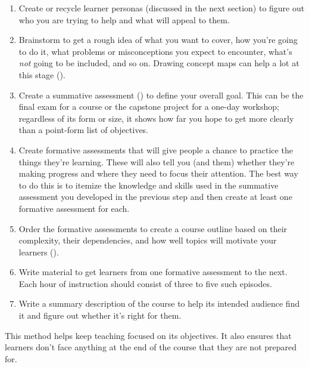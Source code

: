 \begin{enumerate}

\item
  Create or recycle learner personas (discussed in the next section)
  to figure out who you are trying to help and what will appeal to them.

\item
  Brainstorm to get a rough idea of what you want to cover,
  how you're going to do it,
  what problems or misconceptions you expect to encounter,
  what's \emph{not} going to be included,
  and so on.
  Drawing concept maps can help a lot at this stage ().

\item
  Create a summative assessment ()
  to define your overall goal.
  This can be the final exam for a course
  or the capstone project for a one-day workshop;
  regardless of its form or size,
  it shows how far you hope to get
  more clearly than a point-form list of objectives.

\item
  Create formative assessments
  that will give people a chance to practice the things they're learning.
  These will also tell you (and them) whether they're making progress
  and where they need to focus their attention.
  The best way to do this is to itemize the knowledge and skills used in
  the summative assessment you developed in the previous step
  and then create at least one formative assessment for each.

\item
  Order the formative assessments to create a course outline
  based on their complexity,
  their dependencies,
  and how well topics will motivate your learners ().

\item
  Write material to get learners from one formative assessment to the next.
  Each hour of instruction should consist of three to five such episodes.

\item
  Write a summary description of the course
  to help its intended audience find it
  and figure out whether it's right for them.

\end{enumerate}

This method helps keep teaching focused on its objectives.
It also ensures that learners don't face anything at the end of the course
that they are not prepared for.

